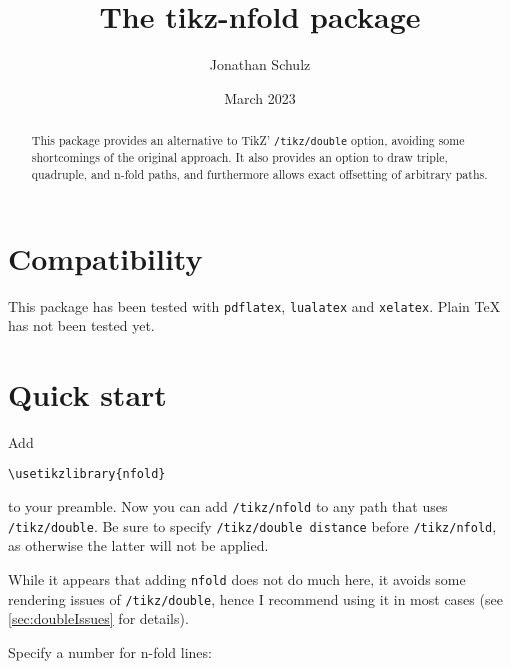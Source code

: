 \documentclass[12pt,a4paper]{article}
\theoremstyle{definition}
\newcommand{\tikzdouble}{\texttt{/tikz/double}}
\newcommand{\nfold}{\texttt{nfold}}
\newcommand{\tikznfold}{\texttt{/tikz/nfold}}
\begin{document}
\title{The \textsf{tikz-nfold} package}
\author{Jonathan Schulz}
\date{March 2023}

\maketitle

\begin{abstract}
  This package provides an alternative to TikZ' \verb|/tikz/double| option, avoiding some shortcomings of the original approach. It also provides an option to draw triple, quadruple, and n-fold paths, and furthermore allows exact offsetting of arbitrary paths.
\end{abstract}

\section*{Compatibility}
This package has been tested with \texttt{pdflatex}, \texttt{lualatex} and \texttt{xelatex}. Plain \TeX{} has not been tested yet.

\section{Quick start}

Add
\begin{verbatim}
\usetikzlibrary{nfold}
\end{verbatim}
to your preamble. Now you can add \tikznfold{} to any path that uses \tikzdouble. Be sure to specify \verb|/tikz/double distance| before \tikznfold, as otherwise the latter will not be applied.

\begin{tkzexample}[latex=4cm]
\end{tkzexample}
While it appears that adding \nfold{} does not do much here, it avoids some rendering issues of \tikzdouble, hence I recommend using it in most cases (see \cref{sec:doubleIssues} for details).

Specify a number for n-fold lines:
\begin{tkzexample}[latex=4cm]
\end{tkzexample}
\end{document}
